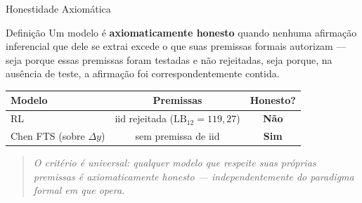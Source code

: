 \documentclass{beamer}
\begin{document}
	
	\begin{frame}{Honestidade Axiomática}
		
		\begin{block}{Definição}                                                                                                                     
			Um modelo é \textbf{axiomaticamente honesto} quando                                                                                      
			nenhuma afirmação inferencial que dele se extrai excede                                                                                  
			o que suas premissas formais autorizam --- seja porque                                                                                   
			essas premissas foram testadas e não rejeitadas, seja                                                                                    
			porque, na ausência de teste, a afirmação foi                                                                                            
			correspondentemente contida.                                                                                                             
		\end{block}
		
		\vspace{0.4em}
		
		\centering
		\footnotesize
		\begin{tabular}{l c c}
			\hline
			\textbf{Modelo} & \textbf{Premissas} & \textbf{Honesto?} \\
			\hline
			RL \parencite{santos2023porto}
			& iid rejeitada ($\text{LB}_{12}\!=\!119{,}27$)
			& \textbf{Não} \\
			Chen FTS (sobre $\Delta y$)
			& sem premissa de iid
			& \textbf{Sim} \\
			\hline
		\end{tabular}
		
		\vspace{0.5em}
		
		\begin{quote}
			\footnotesize\textit{O critério é universal: qualquer
				modelo que respeite suas próprias premissas é
				axiomaticamente honesto --- independentemente do
				paradigma formal em que opera.}
		\end{quote}
		
	\end{frame}
	
\end{document}

